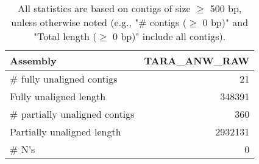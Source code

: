 \documentclass[12pt,a4paper]{article}
\begin{document}
\begin{table}[ht]
\begin{center}
\caption{All statistics are based on contigs of size $\geq$ 500 bp, unless otherwise noted (e.g., "\# contigs ($\geq$ 0 bp)" and "Total length ($\geq$ 0 bp)" include all contigs).}
\begin{tabular}{|l*{1}{|r}|}
\hline
Assembly & TARA\_ANW\_RAW \\ \hline
\# fully unaligned contigs & 21 \\ \hline
Fully unaligned length & 348391 \\ \hline
\# partially unaligned contigs & 360 \\ \hline
Partially unaligned length & 2932131 \\ \hline
\# N's & 0 \\ \hline
\end{tabular}
\end{center}
\end{table}
\end{document}
